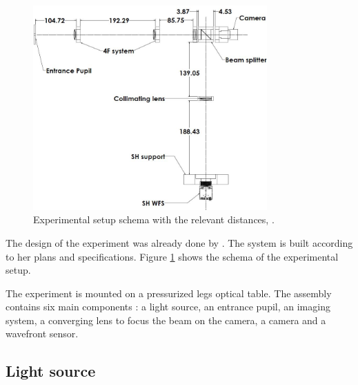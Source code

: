 \begin{figure}
\begin{center}
\includegraphics[width=0.8\textwidth,angle=0]{Figures/setupSchema.JPG}
\decoRule
\caption[Experimental Setup Schema]{Experimental setup schema with the relevant distances, \citep{Bouxin_PDM}.}
\label{fig:setupSchema}
\end{center}
\end{figure}

The design of the experiment was already done by \citet{Bouxin_PDM}. The system is built according to her plans and specifications. Figure \ref{fig:setupSchema} shows the schema of the experimental setup.

The experiment is mounted on a pressurized legs optical table. The assembly contains six main components : a light source, an entrance pupil, an imaging system, a converging lens to focus the beam on the camera, a camera and a wavefront sensor.

\subsection{Light source}
\label{subsec:LigthSource}


